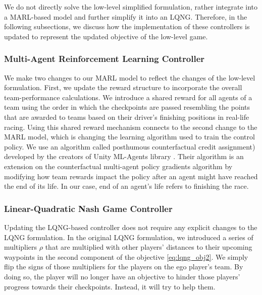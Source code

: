 We do not directly solve the low-level simplified formulation, rather integrate into a MARL-based model and further simplify it into an LQNG. Therefore, in the following subsections, we discuss how the implementation of these controllers is updated to represent the updated objective of the low-level game.

\subsubsection{Multi-Agent Reinforcement Learning Controller}
We make two changes to our MARL model to reflect the changes of the low-level formulation. First, we update the reward structure to incorporate the overall team-performance calculations. We introduce a shared reward for all agents of a team using the order in which the checkpoints are passed resembling the points that are awarded to teams based on their driver's finishing positions in real-life racing. Using this shared reward mechanism connects to the second change to the MARL model, which is changing the learning algorithm used to train the control policy. We use an algorithm called posthumous counterfactual credit assignment) developed by the creators of Unity ML-Agents library \cite{poca}. Their algorithm is an extension on the counterfactual multi-agent policy gradients algorithm by modifying how team rewards impact the policy after an agent might have reached the end of its life. In our case, end of an agent's life refers to finishing the race. 

\subsubsection{Linear-Quadratic Nash Game Controller}
Updating the LQNG-based controller does not require any explicit changes to the LQNG formulation. In the original LQNG formulation, we introduced a series of multipliers $\rho$ that are multiplied with other players' distances to their upcoming waypoints in the second component of the objective \eqref{eq:lqng_obj2}. We simply flip the signs of those multipliers for the players on the ego player's team. By doing so, the player will no longer have an objective to hinder those players' progress towards their checkpoints. Instead, it will try to help them. 


